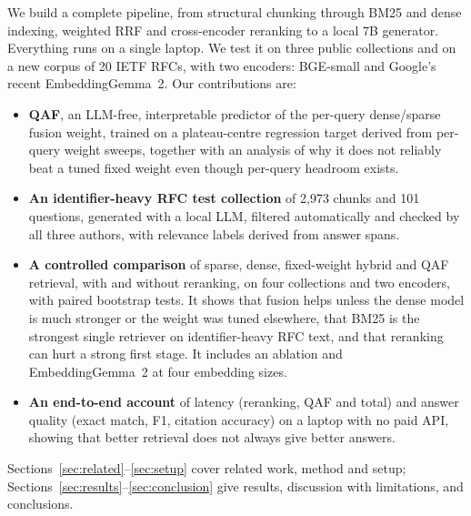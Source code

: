 We build a complete pipeline, from structural
chunking through BM25 and dense indexing, weighted RRF and cross-encoder
reranking to a local 7B generator. Everything runs on a single laptop. We test
it on three public collections and on a new corpus of 20 IETF RFCs, with two
encoders: BGE-small and Google's recent EmbeddingGemma~2. Our contributions
are:
\begin{itemize}
  \item \textbf{QAF}, an LLM-free, interpretable predictor of the per-query
  dense/sparse fusion weight, trained on a plateau-centre regression
  target derived from per-query weight sweeps, together with an analysis of
  why it does not reliably beat a tuned fixed weight even though per-query
  headroom exists.
  \item \textbf{An identifier-heavy RFC test collection} of 2{,}973 chunks and
  101 questions, generated with a local LLM, filtered automatically and
  checked by all three authors, with relevance labels derived from answer
  spans.
  \item \textbf{A controlled comparison} of sparse, dense, fixed-weight hybrid
  and QAF retrieval, with and without reranking, on four collections and two
  encoders, with paired bootstrap tests. It shows that fusion helps unless the
  dense model is much stronger or the weight was tuned elsewhere, that BM25 is the strongest single
  retriever on identifier-heavy RFC text, and that reranking can hurt a
  strong first stage. It includes an ablation and EmbeddingGemma~2 at four
  embedding sizes.
  \item \textbf{An end-to-end account} of latency (reranking, QAF and total) and answer
  quality (exact match, F1, citation accuracy) on a laptop with no paid API,
  showing that better retrieval does not always give better answers.
\end{itemize}

Sections~\ref{sec:related}--\ref{sec:setup} cover related work, method and
setup; Sections~\ref{sec:results}--\ref{sec:conclusion} give results,
discussion with limitations, and conclusions.
